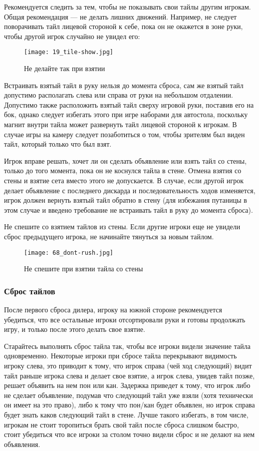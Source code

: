 Рекомендуется следить за тем, чтобы не показывать свои тайлы другим игрокам. Общая рекомендация --- не делать лишних движений. Например, не следует поворачивать тайл лицевой стороной к себе, пока он не окажется в зоне руки, чтобы другой игрок случайно не увидел его:

\begin{figure}[H]
	\centering
	\texttt{[image: 19\_tile-show.jpg]}
	\caption{Не делайте так при взятии}
\end{figure}

Встраивать взятый тайл в руку нельзя до момента сброса, сам же взятый тайл допустимо располагать слева или справа от руки на небольшом отдалении. Допустимо также расположить взятый тайл сверху игровой руки, поставив его на бок, однако следует избегать этого при игре наборами для автостола, поскольку магнит внутри тайла может развернуть тайл лицевой стороной к игрокам. В случае игры на камеру следует позаботиться о том, чтобы зрителям был виден тайл, который только что был взят.

Игрок вправе решать, хочет ли он сделать объявление или взять тайл со стены, только до того момента, пока он не коснулся тайла в стене. Отмена взятия со стены и взятие сета вместо этого не допускается. В случае, если другой игрок делает объявление с последнего дискарда и последовательность ходов изменяется, игрок должен вернуть взятый тайл обратно в стену (для избежания путаницы в этом случае и введено требование не встраивать тайл в руку до момента сброса).

Не спешите со взятием тайлов из стены. Если другие игроки еще не увидели сброс предыдущего игрока, не начинайте тянуться за новым тайлом.

\begin{figure}[H]
	\centering
	\texttt{[image: 68\_dont-rush.jpg]}
	\caption{Не спешите при взятии тайла со стены}
\end{figure}

\subsubsection{Сброс тайлов}

После первого сброса дилера, игроку на южной стороне рекомендуется убедиться, что все остальные игроки отсортировали руки и готовы продолжать игру, и только после этого делать свое взятие.

Старайтесь выполнять сброс тайла так, чтобы все игроки видели значение тайла одновременно. Некоторые игроки при сбросе тайла перекрывают видимость игроку слева, это приводит к тому, что игрок справа (чей ход следующий) видит тайл раньше игрока слева и делает свое взятие, а игрок слева, увидев тайл позже, решает объявить на нем пон или кан. Задержка приведет к тому, что игрок либо не сделает объявление, подумав что следующий тайл уже взяли (хотя технически он имеет на это право), либо к тому что пон/кан будет объявлен, но игрок справа будет знать каков следующий тайл в стене. Лучше такого избегать, в том числе, игрокам не стоит торопиться брать свой тайл после сброса слишком быстро, стоит убедиться что все игроки за столом точно видели сброс и не делают на нем объявления.

